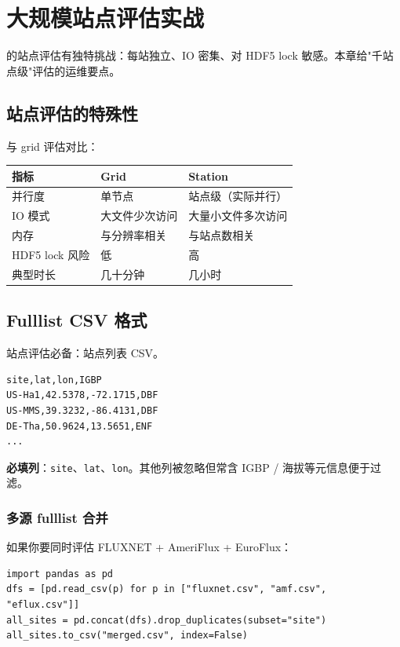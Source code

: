 
\chapter{大规模站点评估实战}

\openbench{} 的站点评估有独特挑战：每站独立、IO 密集、对 HDF5 lock 敏感。本章给"千站点级"评估的运维要点。

\section{站点评估的特殊性}

与 grid 评估对比：

\begin{longtable}{p{3cm} p{4.5cm} p{5cm}}
  \toprule
  指标 & Grid & Station \\
  \midrule
  \endhead
  并行度 & 单节点 & 站点级（实际并行） \\
  IO 模式 & 大文件少次访问 & 大量小文件多次访问 \\
  内存 & 与分辨率相关 & 与站点数相关 \\
  HDF5 lock 风险 & 低 & 高 \\
  典型时长 & 几十分钟 & 几小时 \\
  \bottomrule
\end{longtable}

\section{Fulllist CSV 格式}

站点评估必备：站点列表 CSV。

\begin{verbatim}
site,lat,lon,IGBP
US-Ha1,42.5378,-72.1715,DBF
US-MMS,39.3232,-86.4131,DBF
DE-Tha,50.9624,13.5651,ENF
...
\end{verbatim}

\textbf{必填列}：\texttt{site}、\texttt{lat}、\texttt{lon}。其他列被忽略但常含 IGBP / 海拔等元信息便于过滤。

\subsection{多源 fulllist 合并}

如果你要同时评估 FLUXNET + AmeriFlux + EuroFlux：

\begin{verbatim}
import pandas as pd
dfs = [pd.read_csv(p) for p in ["fluxnet.csv", "amf.csv", "eflux.csv"]]
all_sites = pd.concat(dfs).drop_duplicates(subset="site")
all_sites.to_csv("merged.csv", index=False)
\end{verbatim}

